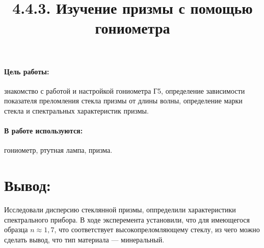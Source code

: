 \documentclass[12pt]{article}
\title{4.4.3. Изучение призмы с помощью гониометра}
\date{}
\begin{document}
\maketitle

\paragraph{Цель работы:}знакомство с работой и настройкой гониометра Г5, определение зависимости показателя преломления стекла призмы от длины волны, определение марки стекла и спектральных характеристик призмы.
\paragraph{В работе используются:}гониометр, ртутная лампа, призма.



\newpage


\section*{Вывод:} Исследовали дисперсию стеклянной призмы, оппределили характеристики спектрального прибора. В ходе эксперемента установили, что для имеющегося образца $n \approx 1,7$, что соответствует высокопреломляющему стеклу, из чего можно сделать вывод, что тип материала --- минеральный.
\end{document}

